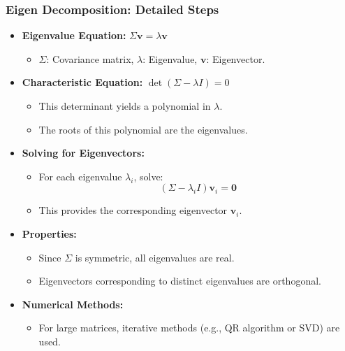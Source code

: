 \documentclass[aspectratio=169]{beamer}
\begin{document}
\begin{frame}
    \frametitle{Eigen Decomposition: Detailed Steps}
    \begin{itemize}
        \item \textbf{Eigenvalue Equation:} $\Sigma \mathbf{v} = \lambda \mathbf{v}$
            \begin{itemize}
                \item \(\Sigma\): Covariance matrix, \(\lambda\): Eigenvalue, \(\mathbf{v}\): Eigenvector.
            \end{itemize}
        \item \textbf{Characteristic Equation:} $\det(\Sigma - \lambda I) = 0$
            \begin{itemize}
                \item This determinant yields a polynomial in \(\lambda\).
                \item The roots of this polynomial are the eigenvalues.
            \end{itemize}
        \item \textbf{Solving for Eigenvectors:}
            \begin{itemize}
                \item For each eigenvalue \(\lambda_i\), solve:
                \[
                (\Sigma - \lambda_i I)\mathbf{v}_i = \mathbf{0}
                \]
                \item This provides the corresponding eigenvector \(\mathbf{v}_i\).
            \end{itemize}
        \item \textbf{Properties:}
            \begin{itemize}
                \item Since \(\Sigma\) is symmetric, all eigenvalues are real.
                \item Eigenvectors corresponding to distinct eigenvalues are orthogonal.
            \end{itemize}
        \item \textbf{Numerical Methods:}
            \begin{itemize}
                \item For large matrices, iterative methods (e.g., QR algorithm or SVD) are used.
            \end{itemize}
    \end{itemize}
    \end{frame}
    
\end{document}
